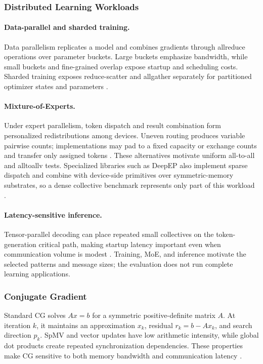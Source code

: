\subsubsection{Distributed Learning Workloads}

\paragraph{Data-parallel and sharded training.} Data parallelism replicates a model and combines gradients through allreduce operations over parameter buckets. Large buckets emphasize bandwidth, while small buckets and fine-grained overlap expose startup and scheduling costs. Sharded training exposes reduce-scatter and allgather separately for partitioned optimizer states and parameters \cite{weingram_xccl_2023}.

\paragraph{Mixture-of-Experts.} Under expert parallelism, token dispatch and result combination form personalized redistributions among devices. Uneven routing produces variable pairwise counts; implementations may pad to a fixed capacity or exchange counts and transfer only assigned tokens \cite{cai_survey_2025,huang_toward_2024}. These alternatives motivate uniform all-to-all and alltoallv tests. Specialized libraries such as DeepEP also implement sparse dispatch and combine with device-side primitives over symmetric-memory substrates, so a dense collective benchmark represents only part of this workload \cite{ma_demystifying_2026,hamidouche_gpu-initiated_2025}.

\paragraph{Latency-sensitive inference.} Tensor-parallel decoding can place repeated small collectives on the token-generation critical path, making startup latency important even when communication volume is modest \cite{shen_every_2026}. Training, MoE, and inference motivate the selected patterns and message sizes; the evaluation does not run complete learning applications.

\subsubsection{Conjugate Gradient}\label{sec:cg-background}

Standard CG solves $Ax=b$ for a symmetric positive-definite matrix $A$. At iteration $k$, it maintains an approximation $x_k$, residual $r_k=b-Ax_k$, and search direction $p_k$. \ac{SpMV} and vector updates have low arithmetic intensity, while global dot products create repeated synchronization dependencies. These properties make CG sensitive to both memory bandwidth and communication latency \cite{trotter_cpu-_2025}.

